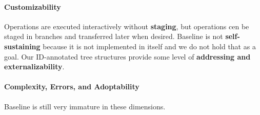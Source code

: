 \documentclass[english,submission]{programming}
\theoremstyle{definition}
\begin{document}
\paragraph{Customizability} Operations are executed interactively without \textbf{staging}, but operations cen be staged in branches and transferred later when desired. Baseline is not \textbf{self-sustaining} because it is not implemented in itself and we do not hold that as a goal. Our ID-annotated tree structures provide some level of \textbf{addressing and externalizability}.

\paragraph{Complexity, Errors, and Adoptability} Baseline is still very immature in these dimensions.





\printbibliography
\end{document}
